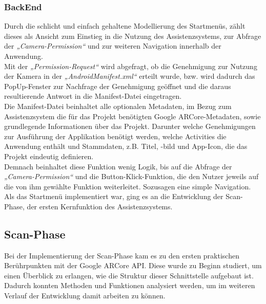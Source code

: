 \subsubsection{BackEnd}
Durch die schlicht und einfach gehaltene Modellierung des Startmenüs, zählt dieses als Ansicht zum Einstieg in die Nutzung des Assistenzsystems, zur Abfrage der 
\textit{„Camera-Permission“} und zur weiteren Navigation innerhalb der Anwendung.
\\ 
Mit der \textit{„Permission-Request“} wird abgefragt, ob die Genehmigung zur Nutzung der Kamera in der \textit{„AndroidManifest.xml“} erteilt wurde, bzw. wird dadurch 
das PopUp-Fenster zur Nachfrage der Genehmigung geöffnet und die daraus resultierende Antwort in die Manifest-Datei eingetragen. 
\\ 
\linebreak
Die Manifest-Datei beinhaltet alle optionalen Metadaten, im Bezug zum Assistenzsystem die für das Projekt benötigten Google ARCore-Metadaten, sowie grundlegende 
Informationen über das Projekt. Darunter welche Genehmigungen zur Ausführung der Applikation benötigt werden, welche Activities die Anwendung enthält und 
Stammdaten, z.B. Titel, -bild und App-Icon, die das Projekt eindeutig definieren.
\\ 
\linebreak
Demnach beinhaltet diese Funktion wenig Logik, bis auf die Abfrage der \textit{„Camera-Permission“} und die Button-Klick-Funktion, die den Nutzer jeweils auf die 
von ihm gewählte Funktion weiterleitet. Sozusagen eine simple Navigation.
\\ 
\linebreak
Als das Startmenü implementiert war, ging es an die Entwicklung der Scan-Phase, der ersten Kernfunktion des Assistenzsystems.  

\subsection{Scan-Phase} %
Bei der Implementierung der Scan-Phase kam es zu den ersten praktischen Berührpunkten mit der Google ARCore \acs{API}. Diese wurde zu Beginn studiert, 
um einen Überblick zu erlangen, wie die Struktur dieser Schnittstelle aufgebaut ist. Dadurch konnten Methoden und Funktionen analysiert werden, um im 
weiteren Verlauf der Entwicklung damit arbeiten zu können.
